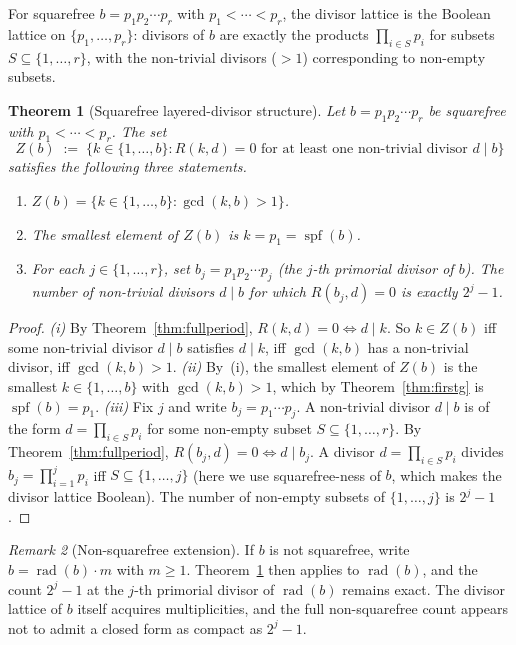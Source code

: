 \documentclass[11pt,reqno]{amsart}
\theoremstyle{plain}
\newtheorem{theorem}{Theorem}[section]
\theoremstyle{definition}
\theoremstyle{remark}
\newtheorem{remark}[theorem]{Remark}
\DeclareMathOperator{\spf}{spf}
\DeclareMathOperator{\rad}{rad}
\begin{document}
For squarefree $b = p_{1} p_{2} \cdots p_{r}$ with
$p_{1} < \cdots < p_{r}$, the divisor lattice is the Boolean lattice
on $\{p_{1}, \dots, p_{r}\}$: divisors of $b$ are exactly the products
$\prod_{i \in S} p_{i}$ for subsets $S \subseteq \{1, \dots, r\}$, with
the non-trivial divisors ($> 1$) corresponding to non-empty subsets.

\begin{theorem}[Squarefree layered-divisor structure]\label{thm:layered}
Let $b = p_{1} p_{2} \cdots p_{r}$ be squarefree with
$p_{1} < \cdots < p_{r}$. The set
\[
  Z(b)
  \;:=\;
  \{k \in \{1, \dots, b\} : R(k, d) = 0
   \text{ for at least one non-trivial divisor } d \mid b\}
\]
satisfies the following three statements.
\begin{enumerate}[label={\upshape(\roman*)}]
\item $Z(b) = \{k \in \{1, \dots, b\} : \gcd(k, b) > 1\}$.
\item The smallest element of $Z(b)$ is $k = p_{1} = \spf(b)$.
\item For each $j \in \{1, \dots, r\}$, set $b_{j} = p_{1} p_{2}
\cdots p_{j}$ (the $j$-th primorial divisor of $b$). The number of
non-trivial divisors $d \mid b$ for which $R(b_{j}, d) = 0$ is exactly
$2^{j} - 1$.
\end{enumerate}
\end{theorem}

\begin{proof}
\emph{(i)} By Theorem~\ref{thm:fullperiod}, $R(k, d) = 0 \Leftrightarrow
d \mid k$. So $k \in Z(b)$ iff some non-trivial divisor $d \mid b$
satisfies $d \mid k$, iff $\gcd(k, b)$ has a non-trivial divisor, iff
$\gcd(k, b) > 1$.
\emph{(ii)} By~(i), the smallest element of $Z(b)$ is the smallest
$k \in \{1, \dots, b\}$ with $\gcd(k, b) > 1$, which by
Theorem~\ref{thm:firstg} is $\spf(b) = p_{1}$.
\emph{(iii)} Fix $j$ and write $b_{j} = p_{1} \cdots p_{j}$. A
non-trivial divisor $d \mid b$ is of the form $d = \prod_{i \in S} p_{i}$
for some non-empty subset $S \subseteq \{1, \dots, r\}$. By
Theorem~\ref{thm:fullperiod}, $R(b_{j}, d) = 0 \Leftrightarrow d \mid b_{j}$.
A divisor $d = \prod_{i \in S} p_{i}$ divides $b_{j} = \prod_{i=1}^{j}
p_{i}$ iff $S \subseteq \{1, \dots, j\}$ (here we use squarefree-ness
of $b$, which makes the divisor lattice Boolean). The number of
non-empty subsets of $\{1, \dots, j\}$ is $2^{j} - 1$.
\end{proof}

\begin{remark}[Non-squarefree extension]\label{rem:layered-nonsf}
If $b$ is not squarefree, write $b = \rad(b) \cdot m$ with $m \ge 1$.
Theorem~\ref{thm:layered} then applies to $\rad(b)$, and the count
$2^{j} - 1$ at the $j$-th primorial divisor of $\rad(b)$ remains
exact. The divisor lattice of $b$ itself acquires multiplicities, and
the full non-squarefree count appears not to admit a closed form as
compact as $2^{j} - 1$.
\end{remark}
\end{document}
